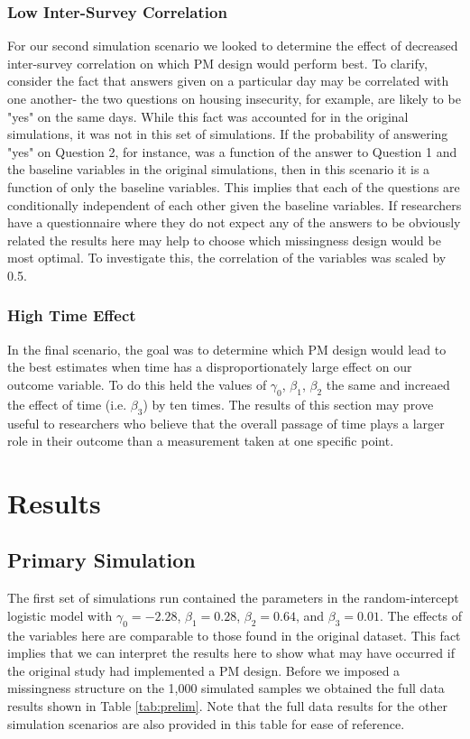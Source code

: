 \documentclass{svjour3}\usepackage[]{graphicx}\usepackage[]{color}
\begin{document}
\subsubsection{Low Inter-Survey Correlation}
For our second simulation scenario we looked to determine the effect of decreased inter-survey correlation on which PM design would perform best. To clarify, consider the fact that answers given on a particular day may be correlated with one another- the two questions on housing insecurity, for example, are likely to be "yes" on the same days. While this fact was accounted for in the original simulations, it was not in this set of simulations. If the probability of answering "yes" on Question 2, for instance, was a function of the answer to Question 1 and the baseline variables in the original simulations, then in this scenario it is a function of only the baseline variables. This implies that each of the questions are conditionally independent of each other given the baseline variables. If researchers have a questionnaire where they do not expect any of the answers to be obviously related the results here may help to choose which missingness design would be most optimal. To investigate this, the correlation of the variables was scaled by 0.5.\par
\subsubsection{High Time Effect}
In the final scenario, the goal was to determine which PM design would lead to the best estimates when time has a disproportionately large effect on our outcome variable. To do this held the values of $\gamma_0$, $\beta_1$, $\beta_2$ the same and increaed the effect of time (i.e. $\beta_3$) by ten times.  The results of this section may prove useful to researchers who believe that the overall passage of time plays a larger role in their outcome than a measurement taken at one specific point. \par

\section{Results}
\label{sec:3}
\subsection{Primary Simulation}
\label{sec:3.1}
The first set of simulations run contained the parameters in the random-intercept logistic model with $\gamma_0 = -2.28$, $\beta_1 = 0.28$, $\beta_2 = 0.64$, and $\beta_3 = 0.01$. The effects of the variables here are comparable to those found in the original dataset. This fact implies that we can interpret the results here to show what may have occurred if the original study had implemented a PM design. Before we imposed a missingness structure on the 1,000 simulated samples we obtained the full data results shown in Table \ref{tab:prelim}. Note that the full data results for the other simulation scenarios are also provided in this table for ease of reference.
\end{document}
